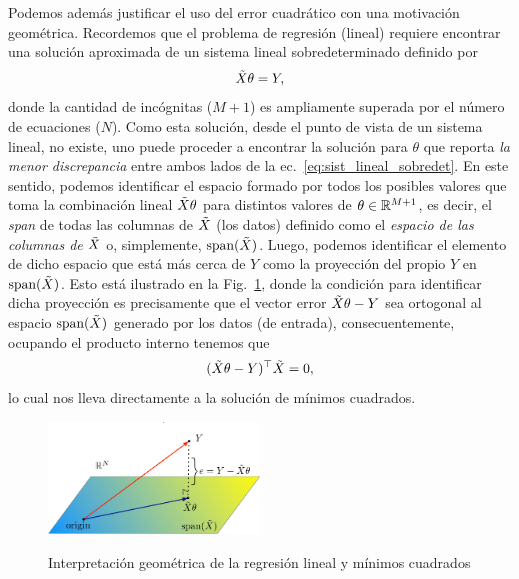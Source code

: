 Podemos además justificar el uso del error cuadrático con una motivación geométrica. Recordemos que el problema de regresión (lineal) requiere encontrar una solución aproximada de un sistema lineal sobredeterminado definido por 
\begin{equation}
	\tilde{X} \theta = Y,\label{eq:sist_lineal_sobredet}
\end{equation}
donde la cantidad de incógnitas ($M+1$) es ampliamente superada por el número de ecuaciones ($N$). Como esta solución, desde el punto de vista de un sistema lineal, no existe, uno puede proceder a encontrar la solución para $\theta$ que reporta \emph{la menor discrepancia} entre ambos lados de la ec.~\eqref{eq:sist_lineal_sobredet}. En este sentido, podemos identificar el espacio formado por todos los posibles valores que toma la combinación lineal $\tilde{X} \theta$ para distintos valores de $\theta\in{\mathbb R}^{M+1}$, es decir, el \emph{span} de todas las columnas de $\tilde{X}$ (los datos) definido como el \emph{espacio de las columnas de} $\tilde{X}$ o, simplemente, $\text{span}(\tilde{X})$. Luego, podemos identificar el elemento de dicho espacio que está más cerca de $Y$  como la proyección del propio $Y$ en $\text{span}(\tilde{X})$. Esto está ilustrado en la Fig.~\ref{fig:projection}, donde la condición para identificar dicha proyección es  precisamente que el vector error $\tilde{X} \theta- Y$ sea ortogonal al espacio  $\text{span}(\tilde{X})$ generado por los datos (de entrada), consecuentemente, ocupando el producto interno tenemos que 
\begin{equation}
	(\tilde{X} \theta- Y)^\top \tilde{X} = 0,
\end{equation}
lo cual nos lleva directamente a la solución de mínimos cuadrados. 

\begin{figure}[t]
	\centering
	\includegraphics[width=0.5\textwidth]{img/LinRegGeo.pdf}\\
	\caption{Interpretación geométrica de la regresión lineal y mínimos cuadrados}
	\label{fig:projection}
\end{figure}

